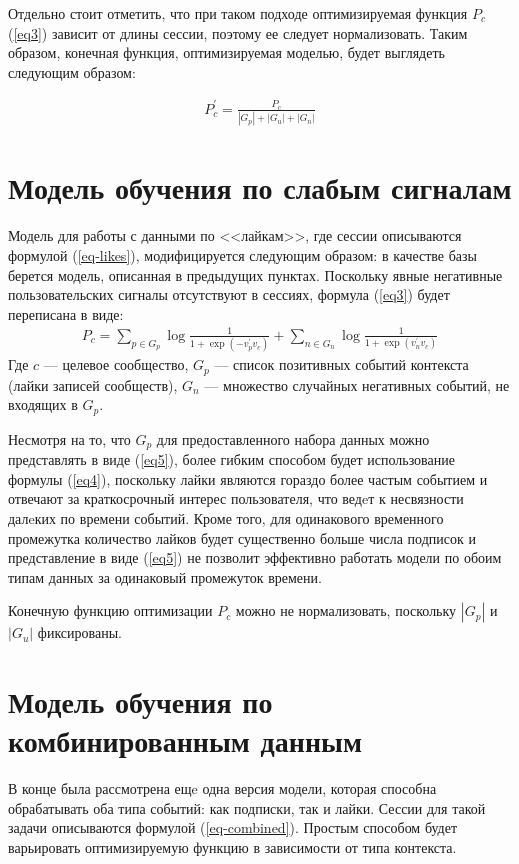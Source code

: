 \documentclass[times,specification,annotation]{itmo-student-thesis}
\begin{document}
Отдельно стоит отметить, что при таком подходе оптимизируемая функция $P_c$ (\ref{eq3}) зависит от длины сессии, поэтому ее следует нормализовать. Таким образом, конечная функция, оптимизируемая моделью, будет выглядеть следующим образом: 

\begin{align}
P_c^{'} = \frac{P_c}{|G_p| + |G_u| + |G_n|} \label{eq6}
\end{align}

\section{Модель обучения по слабым сигналам}\label{sec:algo-likes}

Модель для работы с данными по <<лайкам>>, где сессии описываются формулой (\ref{eq-likes}), модифицируется следующим образом: в качестве базы берется модель, описанная в предыдущих пунктах. Поскольку явные негативные пользовательских сигналы отсутствуют в сессиях, формула (\ref{eq3}) будет переписана в виде:
\begin{align}
P_c = \sum_{p \in G_p} \log \frac{1}{1 + \exp(-v_p^{'}v_c)} + \sum_{n \in G_n} \log \frac{1}{1 + \exp(v_n^{'}v_c)} \label{eq7}
 \end{align}
Где $c$ --- целевое сообщество, $G_p$ --- список позитивных событий
контекста (лайки записей сообществ), $G_n$ --- множество случайных негативных событий, не входящих в $G_p$. 

Несмотря на то, что $G_p$ для предоставленного набора данных можно представлять в виде (\ref{eq5}), более гибким способом будет использование формулы (\ref{eq4}), поскольку лайки являются гораздо более частым событием и отвечают за краткосрочный интерес пользователя, что ведeт к несвязности далeких по времени событий. Кроме того, для одинакового временного промежутка количество лайков будет существенно больше числа подписок и представление в виде (\ref{eq5}) не позволит эффективно работать модели по обоим типам данных за одинаковый промежуток времени. 

Конечную функцию оптимизации  $P_c$ можно не нормализовать, поскольку $|G_p|$ и $|G_u|$ фиксированы.

\section{Модель обучения по комбинированным данным}\label{sec:algo-combined}

В конце была рассмотрена ещe одна версия модели, которая способна обрабатывать оба типа событий: как подписки, так и лайки. Сессии для такой задачи описываются формулой (\ref{eq-combined}). Простым способом будет варьировать оптимизируемую функцию в зависимости от типа контекста. 
\end{document}
